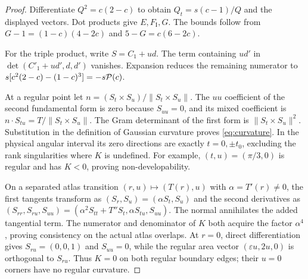 \documentclass[11pt,a4paper]{article}
\theoremstyle{definition}\newtheorem{definition}[theorem]{Definition}
\theoremstyle{remark}\newtheorem{remark}[theorem]{Remark}
\begin{document}
\begin{proof}
Differentiate $Q^2=c(2-c)$ to obtain $Q_t=s(c-1)/Q$ and the displayed
vectors. Dot products give $E,F_{\mathrm I},G$. The bounds follow from
$G-1=(1-c)(4-2c)$ and $5-G=c(6-2c)$.

For the triple product, write $S=C_1+u d$. The term containing $u d'$ in
$\det(C'_1+ud',d,d')$ vanishes. Expansion reduces the remaining
numerator to
$s[c^2(2-c)-(1-c)^3]=-s\mathcal P(c)$.

At a regular point let $n=(S_t\times S_u)/\lVert S_t\times S_u\rVert$.
The $uu$ coefficient of the second fundamental form is zero because
$S_{uu}=0$, and its mixed coefficient is $n\cdot S_{tu}=T/\lVert
S_t\times S_u\rVert$. The Gram determinant of the first form is
$\lVert S_t\times S_u\rVert^2$. Substitution in the definition of
Gaussian curvature proves \eqref{eq:curvature}. In the physical angular
interval its zero directions are exactly $t=0,\pm t_0$, excluding the rank
singularities where $K$ is undefined. For example,
$(t,u)=(\pi/3,0)$ is regular and has $K<0$, proving non-developability.

On a separated atlas transition $(r,u)\mapsto(T(r),u)$ with
$\alpha=T'(r)\ne0$, the first tangents transform as
$(S_r,S_u)=(\alpha S_t,S_u)$ and the second derivatives as
$(S_{rr},S_{ru},S_{uu})=(\alpha^2S_{tt}+T''S_t,\alpha S_{tu},S_{uu})$.
The normal annihilates the added tangential term. The numerator and
denominator of $K$ both acquire the factor $\alpha^4$, proving
consistency on the actual atlas overlaps. At $r=0$, direct differentiation
gives $S_{ru}=(0,0,1)$ and $S_{uu}=0$, while the regular area vector
$(\varepsilon u,2u,0)$ is orthogonal to $S_{ru}$. Thus $K=0$ on both
regular boundary edges; their $u=0$ corners have no regular curvature.
\end{proof}
\end{document}
